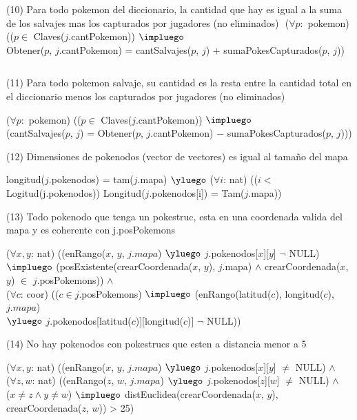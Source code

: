 \begin{Representacion}
(10) Para todo pokemon del diccionario, la cantidad que hay es igual a la suma de los salvajes mas los capturados por jugadores (no eliminados) $ $\newline
($\forall p: $ pokemon) (($p \in$ Claves($j$.cantPokemon)) $\impluego$ \\
  Obtener($p$, $j$.cantPokemon) = cantSalvajes($p$, $j$) $+$ sumaPokesCapturados($p$, $j$))

$ $\newline

(11) Para todo pokemon salvaje, su cantidad es la resta entre la cantidad total en el diccionario menos los capturados por jugadores (no eliminados) $ $\newline

($\forall p: $ pokemon) (($p \in$ Claves($j$.cantPokemon)) $\impluego$ \\ 
  (cantSalvajes($p$, $j$) = Obtener($p$, $j$.cantPokemon) $-$ sumaPokesCapturados($p$, $j$)))
$ $\newline


(12) Dimensiones de pokenodos (vector de vectores) es igual al tama\~no del mapa $ $\newline

longitud($j$.pokenodos) = tam($j$.mapa) $\yluego$ 
($\forall i$: nat) (($i <$ Logitud(j.pokenodos)) Longitud($j$.pokenodos[i]) = Tam($j$.mapa)) 
$ $\newline

(13) Todo pokenodo que tenga un pokestruc, esta en una coordenada valida del mapa y es coherente con j.posPokemons$ $\newline

($\forall x, y$: nat) ((enRango($x$, $y$, $j.mapa$) $\yluego$ $j$.pokenodos[$x$][$y$] $\neg$ NULL) \\
  $\impluego$ (posExistente(crearCoordenada($x$, $y$), $j$.mapa) $\land$ crearCoordenada($x$, $y$) $\in$ $j$.posPokemons)) $\land$ \\
($\forall c$: coor) (($c \in j$.posPokemons) $\impluego$ (enRango(latitud($c$), longitud($c$), $j.mapa$) \\
$\yluego$ $j$.pokenodos[latitud($c$)][longitud($c$)] $\neg$ NULL))
$ $\newline


(14) No hay pokenodos con pokestrucs que esten a distancia menor a 5 $ $\newline

($\forall x, y$: nat) ((enRango($x$, $y$, $j.mapa$) $\yluego$ $j$.pokenodos[$x$][$y$] $\neq$ NULL) $ \land$\\
($\forall z, w$: nat) ((enRango($z$, $w$, $j.mapa$) $\yluego$ $j$.pokenodos[$z$][$w$] $\neq$ NULL) $\land$ \\
($x \neq z \land y \neq w$) $\impluego$  distEuclidea(crearCoordenada($x$, $y$), crearCoordenada($z$, $w$)) > 25)


\end{Representacion}
